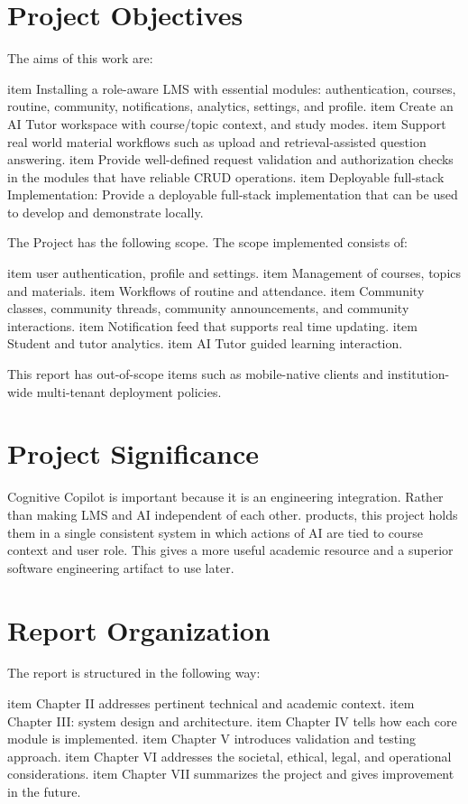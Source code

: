 \section{Project Objectives}
The aims of this work are:
\begin{enumerate}[label=\arabic*.]
	item Installing a role-aware LMS with essential modules: authentication, courses, routine, community, notifications,
	analytics, settings, and profile.
	item Create an AI Tutor workspace with course/topic context, and study modes.
	item Support real world material workflows such as upload and retrieval-assisted question answering.
	item Provide well-defined request validation and authorization checks in the modules that have reliable CRUD operations.
	item Deployable full-stack Implementation: Provide a deployable full-stack implementation that can be used to develop and demonstrate locally.
\end{enumerate}
The Project has the following scope.
The scope implemented consists of:
\begin{itemize}
	item user authentication, profile and settings.
	item Management of courses, topics and materials.
	item Workflows of routine and attendance.
	item Community classes, community threads, community announcements, and community interactions.
	item Notification feed that supports real time updating.
	item Student and tutor analytics.
	item AI Tutor guided learning interaction.
\end{itemize}

This report has out-of-scope items such as mobile-native clients and institution-wide multi-tenant deployment policies.

\section{Project Significance}
Cognitive Copilot is important because it is an engineering integration. Rather than making LMS and AI independent of each other.
products, this project holds them in a single consistent system in which actions of AI are tied to course context and user role.
This gives a more useful academic resource and a superior software engineering artifact to use later.

\section{Report Organization}
The report is structured in the following way:
\begin{itemize}
	item Chapter II addresses pertinent technical and academic context.
	item Chapter III: system design and architecture.
	item Chapter IV tells how each core module is implemented.
	item Chapter V introduces validation and testing approach.
	item Chapter VI addresses the societal, ethical, legal, and operational considerations.
	item Chapter VII summarizes the project and gives improvement in the future.
\end{itemize}